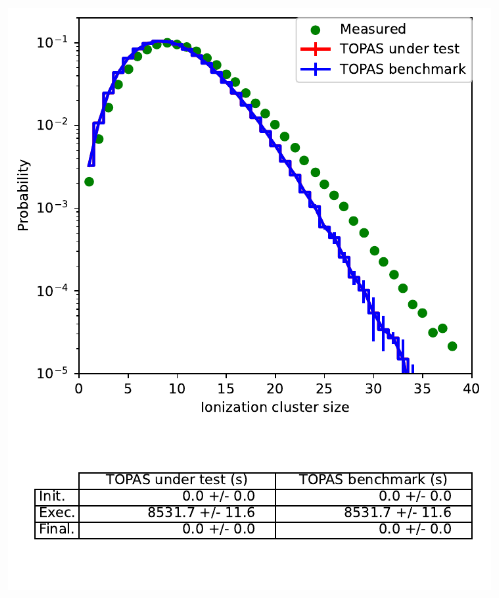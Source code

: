 \documentclass[aspectratio=1610]{beamer}
\begin{document}
\begin{frame}{\secname}
  \begin{columns}
    \begin{column}{0.4\linewidth}
     \includegraphics[width=\textwidth]{./NanodosimetryI/IDDistribution_opt4}
    \end{column}
    \begin{column}{0.4\linewidth} 

\end{column}
\end{columns}
\end{frame}
\end{document}
